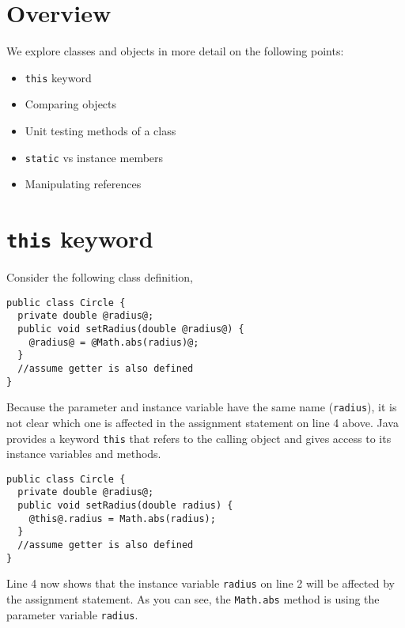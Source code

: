 \def\topic{Classes and Objects - 2}


\section{Overview}

    We explore classes and objects in more detail on the following points:
    
    \begin{itemize}
    \item \texttt{this} keyword
    \item Comparing objects
    \item Unit testing methods of a class
    \item \texttt{static} vs instance members
    \item Manipulating references
    \end{itemize}
 
 
\section{\texttt{this} keyword}
  Consider the following class definition,
 
\begin{lstlisting}[frame=single,style=buggy]
public class Circle {
  private double @radius@;
  public void setRadius(double @radius@) {
    @radius@ = @Math.abs(radius)@;
  }
  //assume getter is also defined
}
\end{lstlisting}  

Because the parameter and instance variable have the same name (\texttt{radius}), it is not clear which one is affected in the assignment statement on line 4 above.
\vskip 0.5cm
Java provides a keyword \texttt{this} that refers to the calling object and gives access to its instance variables and methods. 
  \begin{lstlisting}[frame=single,style=correct]
public class Circle {
  private double @radius@;
  public void setRadius(double radius) {
    @this@.radius = Math.abs(radius);
  }
  //assume getter is also defined
}
  \end{lstlisting}  
  Line 4 now shows that the instance variable \texttt{radius} on line 2 will be affected by the assignment statement. As you can see, the \texttt{Math.abs} method  is using the parameter variable \texttt{radius}.

